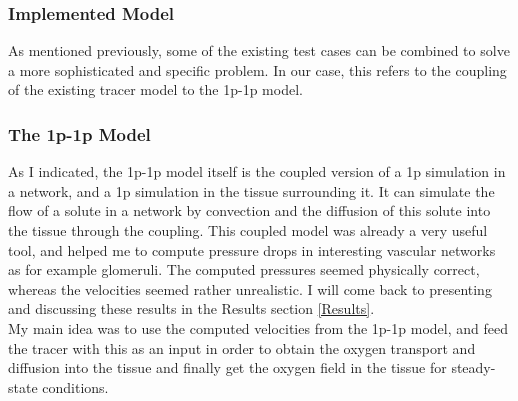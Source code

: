 \subsubsection{Implemented Model}

As mentioned previously, some of the existing test cases can be combined to solve a more sophisticated and specific problem. In our case, this refers to the coupling of the existing tracer model to the 1p-1p model.\\

\subsubsection*{The 1p-1p Model}

As I indicated, the 1p-1p model itself is the coupled version of a 1p simulation in a network, and a 1p simulation in the tissue surrounding it. It can simulate the flow of a solute in a network by convection and the diffusion of this solute into the tissue through the coupling. This coupled model was already a very useful tool, and helped me to compute pressure drops in interesting vascular networks as for example glomeruli. The computed pressures seemed physically correct, whereas the velocities seemed rather unrealistic. I will come back to presenting and discussing these results in the Results section \ref{Results}.\\
My main idea was to use the computed velocities from the 1p-1p model, and feed the tracer with this as an input in order to obtain the oxygen transport and diffusion into the tissue and finally get the oxygen field in the tissue for steady-state conditions.\\


%

